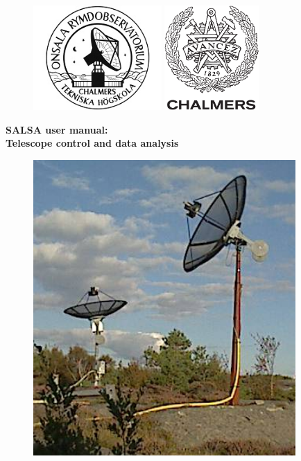 \begin{titlepage}

\begin{figure}[t]
\vspace{-2cm}
\centering
\includegraphics[height=4cm]{../figures/OSO-logo.jpg}
\hspace{4cm}
\includegraphics[height=4cm]{../figures/CHALMERS-logo.pdf}
\vspace{1cm}
\end{figure}

\begin{center}
{\bf
{\Huge SALSA user manual:}\\
\bigskip
{\Huge Telescope control and data analysis}
}
\end{center}

\begin{figure}[!h]
\centering
\includegraphics[width=10cm]{../figures/SALSA.png}
\end{figure}



\end{titlepage}
